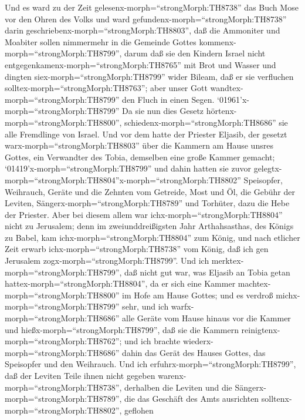  Und es ward zu der Zeit
gelesenx-morph=``strongMorph:TH8738'' das Buch Mose vor den Ohren des
Volks und ward gefundenx-morph=``strongMorph:TH8738'' darin
geschriebenx-morph=``strongMorph:TH8803'', daß die Ammoniter und
Moabiter sollen nimmermehr in die Gemeinde Gottes
kommenx-morph=``strongMorph:TH8799'',  darum daß sie den
Kindern Israel nicht entgegenkamenx-morph=``strongMorph:TH8765'' mit
Brot und Wasser und dingten siex-morph=``strongMorph:TH8799'' wider
Bileam, daß er sie verfluchen solltex-morph=``strongMorph:TH8763''; aber
unser Gott wandtex-morph=``strongMorph:TH8799'' den Fluch in einen
Segen.  `01961'\textbar x-morph=``strongMorph:TH8799'' Da
sie nun dies Gesetz hörtenx-morph=``strongMorph:TH8800'',
schiedenx-morph=``strongMorph:TH8686'' sie alle Fremdlinge von Israel.
 Und vor dem hatte der Priester Eljasib, der gesetzt
warx-morph=``strongMorph:TH8803'' über die Kammern am Hause unsres
Gottes, ein Verwandter des Tobia, demselben eine große Kammer gemacht;
 `01419'x-morph=``strongMorph:TH8799'' und dahin hatten sie
zuvor gelegtx-morph=``strongMorph:TH8804''x-morph=``strongMorph:TH8802''
Speisopfer, Weihrauch, Geräte und die Zehnten vom Getreide, Most und Öl,
die Gebühr der Leviten, Sängerx-morph=``strongMorph:TH8789'' und
Torhüter, dazu die Hebe der Priester.  Aber bei diesem allem
war ichx-morph=``strongMorph:TH8804'' nicht zu Jerusalem; denn im
zweiunddreißigsten Jahr Arthahsasthas, des Königs zu Babel, kam
ichx-morph=``strongMorph:TH8804'' zum König, und nach etlicher Zeit
erwarb ichx-morph=``strongMorph:TH8738'' vom König,  daß ich
gen Jerusalem zogx-morph=``strongMorph:TH8799''. Und ich
merktex-morph=``strongMorph:TH8799'', daß nicht gut war, was Eljasib an
Tobia getan hattex-morph=``strongMorph:TH8804'', da er sich eine Kammer
machtex-morph=``strongMorph:TH8800'' im Hofe am Hause Gottes;
 und es verdroß michx-morph=``strongMorph:TH8799'' sehr, und
ich warfx-morph=``strongMorph:TH8686'' alle Geräte vom Hause hinaus vor
die Kammer  und hießx-morph=``strongMorph:TH8799'', daß sie
die Kammern reinigtenx-morph=``strongMorph:TH8762''; und ich brachte
wiederx-morph=``strongMorph:TH8686'' dahin das Gerät des Hauses Gottes,
das Speisopfer und den Weihrauch.  Und ich
erfuhrx-morph=``strongMorph:TH8799'', daß der Leviten Teile ihnen nicht
gegeben warenx-morph=``strongMorph:TH8738'', derhalben die Leviten und
die Sängerx-morph=``strongMorph:TH8789'', die das Geschäft des Amts
ausrichten solltenx-morph=``strongMorph:TH8802'', geflohen
